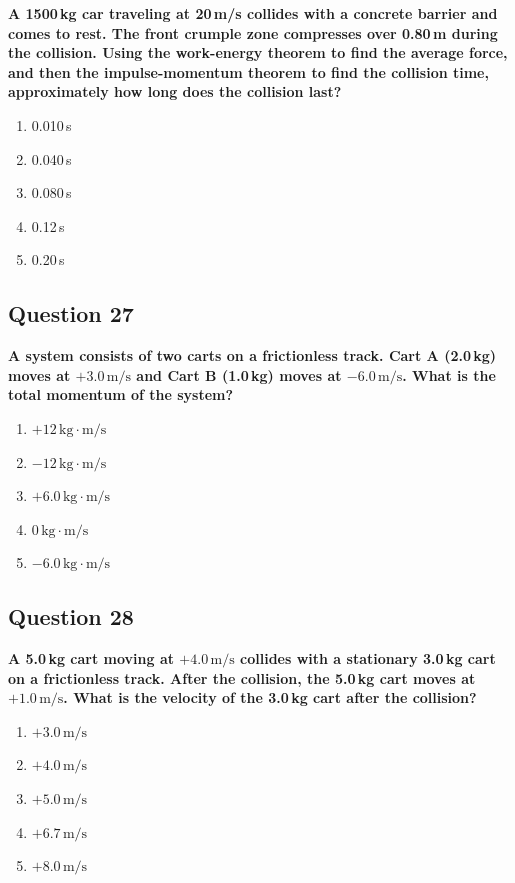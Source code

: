 \documentclass[12pt,letterpaper]{article}
\begin{document}
\begin{questionbox}
\textbf{A 1500\,kg car traveling at 20\,m/s collides with a concrete barrier and comes to rest. The front crumple zone compresses over 0.80\,m during the collision. Using the work-energy theorem to find the average force, and then the impulse-momentum theorem to find the collision time, approximately how long does the collision last?}

\begin{enumerate}[label=\alph*)]
    \item 0.010\,s
    \item 0.040\,s
    \item 0.080\,s
    \item 0.12\,s
    \item 0.20\,s
\end{enumerate}
\end{questionbox}

\subsection{Question 27}

\begin{questionbox}
\textbf{A system consists of two carts on a frictionless track. Cart A (2.0\,kg) moves at $+3.0\,\text{m/s}$ and Cart B (1.0\,kg) moves at $-6.0\,\text{m/s}$. What is the total momentum of the system?}

\begin{enumerate}[label=\alph*)]
    \item $+12\,\text{kg}\cdot\text{m/s}$
    \item $-12\,\text{kg}\cdot\text{m/s}$
    \item $+6.0\,\text{kg}\cdot\text{m/s}$
    \item $0\,\text{kg}\cdot\text{m/s}$
    \item $-6.0\,\text{kg}\cdot\text{m/s}$
\end{enumerate}
\end{questionbox}

\subsection{Question 28}

\begin{questionbox}
\textbf{A 5.0\,kg cart moving at $+4.0\,\text{m/s}$ collides with a stationary 3.0\,kg cart on a frictionless track. After the collision, the 5.0\,kg cart moves at $+1.0\,\text{m/s}$. What is the velocity of the 3.0\,kg cart after the collision?}

\begin{enumerate}[label=\alph*)]
    \item $+3.0\,\text{m/s}$
    \item $+4.0\,\text{m/s}$
    \item $+5.0\,\text{m/s}$
    \item $+6.7\,\text{m/s}$
    \item $+8.0\,\text{m/s}$
\end{enumerate}
\end{questionbox}
\end{document}
